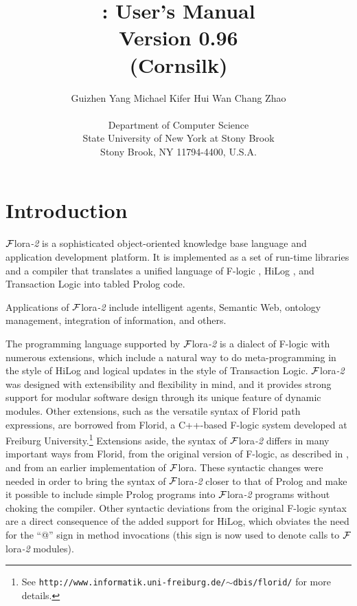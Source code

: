 \documentclass[11pt]{article}
\title{
        \FLORA: User's Manual
           \\
       {\Large Version 0.96}
       \vspace{-2mm}\\
       {\large (Cornsilk)}
       }
\author{
  {Guizhen Yang
  \hspace{1cm}
  Michael Kifer
  \hspace{1cm}
  Hui Wan
  \hspace{1cm}
  Chang Zhao
}
  \\\\
  Department of Computer Science\\
  State University of New York at Stony Brook\\
  Stony Brook, NY 11794-4400, U.S.A.
  }
\newcommand{\FLORA}{{\mbox{\sc ${\cal F}${lora}\rm\emph{-2}}}\xspace}
\newcommand{\FLORAone}{{\mbox{${\cal F}${\sc lora}}}\xspace}
\newcommand{\FLORID}{{\mbox{\sc Florid}}\xspace}
\newcommand{\fl}{\mbox{F-logic}\xspace}
\begin{document}
\maketitle
\thispagestyle{empty}

\newpage
{}
\setcounter{page}{1}

\tableofcontents

\newpage

\setcounter{page}{1}


\section{Introduction}\label{sec-intro}

\FLORA is a sophisticated object-oriented knowledge base language and
application development platform. It is implemented as a set of run-time
libraries and a compiler that translates a unified language of \fl
\cite{KLW95}, HiLog \cite{hilog-jlp}, and Transaction Logic
\cite{trans-chapter-98,trans-tcs94} into tabled Prolog code.

Applications of \FLORA include intelligent agents, Semantic Web, ontology
management, integration of information, and others. 

The programming language supported by \FLORA is a dialect of \fl with
numerous extensions, which include a natural way to do meta-programming in
the style of HiLog and logical updates in the style of Transaction
Logic. \FLORA was designed with extensibility and flexibility in mind, and
it provides strong support for modular software design through its unique
feature of dynamic modules.
Other extensions, such as the versatile syntax of \FLORID path
expressions, are borrowed from
\FLORID, a C++-based \fl system developed at
Freiburg University.\footnote{
  See {\tt http://www.informatik.uni-freiburg.de/$\sim$dbis/florid/} for more
  details.
}
Extensions aside, the syntax of \FLORA differs in many
important ways from \FLORID, from the original version of \fl, as described
in \cite{KLW95}, and from an earlier implementation of \FLORAone. These
syntactic changes were needed in order to bring the syntax of \FLORA closer
to that of Prolog and make it possible to include simple Prolog programs
into \FLORA programs without choking the compiler.  Other syntactic
deviations from the original F-logic syntax are a direct consequence of the
added support for HiLog, which obviates the need for the ``@'' sign in
method invocations (this sign is now used to denote calls to \FLORA
modules).
\end{document}

